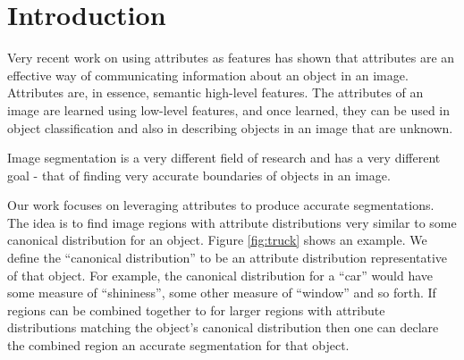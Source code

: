 \documentclass[10pt,twocolumn,letterpaper]{article}
\begin{document}
\section{Introduction}
Very recent work on using attributes as features \cite{farhadi09, lampert09}
has shown that attributes are an effective way of communicating information
about an object in an image.  Attributes are, in essence, semantic high-level
features.  The attributes of an image are learned using low-level features,
and once learned, they can be used in object classification and also in describing
objects in an image that are unknown.

Image segmentation is a very different field of research and has a very different
goal - that of finding very accurate boundaries of objects in an image.

Our work focuses on leveraging attributes to produce accurate segmentations.
The idea is to find image regions with attribute distributions very similar
to some canonical distribution for an object.  Figure \ref{fig:truck} shows
an example.  We define the ``canonical distribution''
to be an attribute distribution representative of that object.  For example, the
canonical distribution for a ``car'' would have some measure of ``shininess'', some
other measure of ``window'' and so forth.  If
regions can be combined together to for larger regions with attribute
distributions matching the object's canonical distribution then one can
declare the combined region an accurate segmentation for that object.

\end{document}
